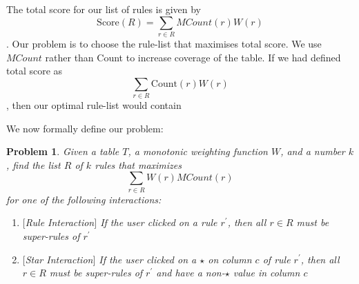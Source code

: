 \documentclass{sig-alternate}
\newcounter{prob}
\newtheorem{problem}[prob]{Problem}
\begin{document}
The total score for our list of rules is given by $$\text{Score}(R) = \sum_{r \in R} MCount(r)W(r)$$. Our problem is to choose the rule-list that maximises total score. We use $MCount$ rather than Count to increase coverage of the table. If we had defined total score as $$\sum_{r \in R} \text{Count}(r)W(r)$$, then our optimal rule-list would contain 

We now formally define our problem:

\begin{problem}\label{prob:optimal-subrule-list}
Given a table $T$, a monotonic weighting function $W$, and a number $k$, find the list $R$ of $k$ rules that maximizes 
$$\sum_{r \in R} W(r)MCount(r)$$
for one of the following interactions:
\begin{enumerate}
\item $[$Rule Interaction$]$ If the user clicked on a rule $r^{\prime}$, then all $r \in R$ must be super-rules of $r^{\prime}$
\item $[$Star Interaction$]$ If the user clicked on a $\star$ on column $c$ of rule $r^{\prime}$, then all $r \in R$ must be super-rules of $r^{\prime}$ and have a non-$\star$ value in column $c$
\end{enumerate}
\end{problem}

\end{document}
